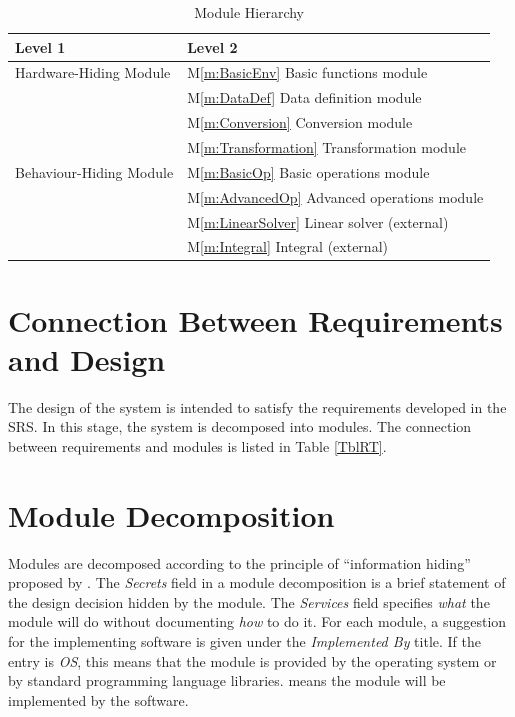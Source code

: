 \documentclass[12pt, titlepage]{article}
\newcommand{\mref}[1]{M\ref{m:#1}}
\begin{document}
\begin{table}[h!]
\centering
\begin{tabular}{p{} p{}}
\toprule
\textbf{Level 1} & \textbf{Level 2}\\
\midrule

{Hardware-Hiding Module} & \mref{BasicEnv} Basic functions module \\
\midrule

\multirow{7}{0.3\textwidth}{Behaviour-Hiding Module} 
& \mref{DataDef} Data definition module\\
& \mref{Conversion} Conversion module\\
& \mref{Transformation} Transformation module\\
& \mref{BasicOp} Basic operations module\\
& \mref{AdvancedOp} Advanced operations module\\
\midrule

\multirow{3}{0.3\textwidth}{Software Decision Module} 
& \mref{LinearSolver} Linear solver (external)\\
& \mref{Integral} Integral (external)\\
\bottomrule

\end{tabular}
\caption{Module Hierarchy}
\label{TblMH}
\end{table}

\section{Connection Between Requirements and Design} \label{SecConnection}

The design of the system is intended to satisfy the requirements developed in
the SRS. In this stage, the system is decomposed into modules. The connection
between requirements and modules is listed in Table \ref{TblRT}.

\section{Module Decomposition} \label{SecMD}

Modules are decomposed according to the principle of ``information hiding''
proposed by \citet{ParnasEtAl1984}. The \emph{Secrets} field in a module
decomposition is a brief statement of the design decision hidden by the
module. The \emph{Services} field specifies \emph{what} the module will do
without documenting \emph{how} to do it. For each module, a suggestion for the
implementing software is given under the \emph{Implemented By} title. If the
entry is \emph{OS}, this means that the module is provided by the operating
system or by standard programming language libraries.  \emph{\progname{}} means the
module will be implemented by the \progname{} software.
\end{document}
